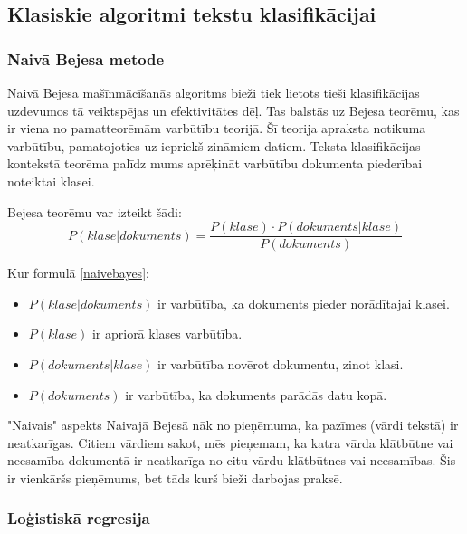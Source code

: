 \subsection{Klasiskie algoritmi tekstu klasifikācijai}

\subsubsection{Naivā Bejesa metode}
Naivā Bejesa  mašīnmācīšanās algoritms bieži tiek lietots tieši klasifikācijas uzdevumos tā veiktspējas un efektivitātes dēļ.  Tas balstās uz Bejesa teorēmu, kas ir viena no pamatteorēmām varbūtību teorijā. Šī teorija apraksta notikuma varbūtību, pamatojoties uz iepriekš zināmiem datiem. Teksta klasifikācijas kontekstā teorēma palīdz mums aprēķināt varbūtību dokumenta piederībai noteiktai klasei.

Bejesa teorēmu var izteikt šādi:
\begin{equation} \label{naivebayes}
   P(klase|dokuments) = \frac{P(klase) \cdot P(dokuments|klase)}{P(dokuments)}
\end{equation}

 Kur formulā \ref{naivebayes}:
\begin{itemize}
\item \(P(klase|dokuments)\) ir varbūtība, ka dokuments pieder norādītajai klasei.
\item \(P(klase)\) ir apriorā klases varbūtība.
\item \(P(dokuments|klase)\) ir varbūtība novērot dokumentu, zinot klasi.
\item \(P(dokuments)\) ir varbūtība, ka dokuments parādās datu kopā.
\end{itemize}

"Naivais" aspekts Naivajā Bejesā nāk no pieņēmuma, ka pazīmes (vārdi tekstā) ir neatkarīgas. Citiem vārdiem sakot, mēs pieņemam, ka katra vārda klātbūtne vai neesamība dokumentā ir neatkarīga no citu vārdu klātbūtnes vai neesamības. Šis ir vienkāršs pieņēmums, bet tāds kurš bieži darbojas praksē.

\subsubsection{Loģistiskā regresija}

